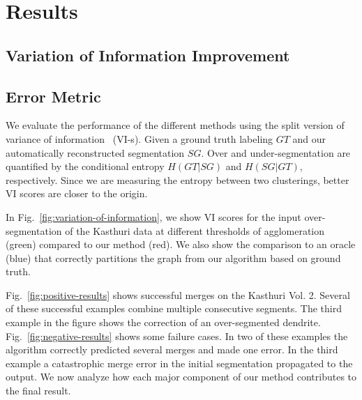 \section{Results}

\subsection{Variation of Information Improvement}

\subsection{Error Metric}
\label{sec:variation-of-information}

We evaluate the performance of the different methods using the split version of variance of information~\cite{meila2003comparing} (VI-s). Given a ground truth labeling $GT$ and our automatically reconstructed segmentation $SG$.
Over and under-segmentation are quantified by the conditional entropy $H(GT | SG)$ and $H(SG | GT)$, respectively. Since we are measuring the entropy between two clusterings, better VI scores are closer to the origin.

In Fig.~\ref{fig:variation-of-information}, we show VI scores for the input over-segmentation of the Kasthuri data  at different thresholds of agglomeration (green) compared to our method (red). We also show the comparison to an oracle (blue) that correctly partitions the graph from our algorithm based on ground truth. 


Fig.~\ref{fig:positive-results} shows successful merges on the Kasthuri Vol. 2. Several of these successful examples combine multiple consecutive segments. The third example in the figure shows the correction of an over-segmented dendrite.
Fig.~\ref{fig:negative-results} shows some failure cases. In two of these examples the algorithm correctly predicted several merges and made one error.
In the third example a catastrophic merge error  in the initial segmentation propagated to the output. We now analyze how each major component of our method contributes to the final result.

